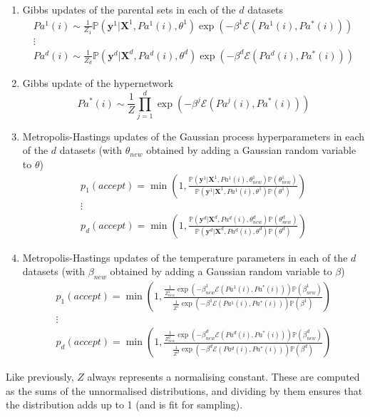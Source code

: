 \documentclass{article}
\begin{document}
\begin{enumerate}
\item Gibbs updates of the parental sets in each of the $d$ datasets
\begin{equation*}
\begin{split}
Pa^1(i) \sim \frac{1}{Z_{1}}\mathbb{P}(\mathbf{y}^1|\mathbf{X}^1,Pa^1(i),\theta^1)\exp\left ( -\beta^1\mathcal{E}(Pa^1(i),Pa^*(i)) \right ) \\
\vdots \\
Pa^d(i) \sim \frac{1}{Z_{d}}\mathbb{P}(\mathbf{y}^d|\mathbf{X}^d,Pa^d(i),\theta^d)\exp\left ( -\beta^d\mathcal{E}(Pa^d(i),Pa^*(i)) \right )
\end{split}
\end{equation*}
\item Gibbs update of the hypernetwork
\begin{equation*}
Pa^*(i) \sim \frac{1}{Z}\prod_{j=1}^{d}\exp\left ( -\beta^j\mathcal{E}(Pa^j(i),Pa^*(i)) \right )
\end{equation*}
\item Metropolis-Hastings updates of the Gaussian process hyperparameters in each of the $d$ datasets (with $\theta_{new}$ obtained by adding a Gaussian random variable to $\theta$)
\begin{equation*}
\begin{split}
p_1(accept) = \min\left(1,\frac{\mathbb{P}(\mathbf{y}^1|\mathbf{X}^1,Pa^1(i),\theta_{new}^1)\mathbb{P}(\theta_{new}^1)}{\mathbb{P}(\mathbf{y}^1|\mathbf{X}^1,Pa^1(i),\theta^1)\mathbb{P}(\theta^1)}\right) \\
\vdots \\
p_d(accept) = \min\left(1,\frac{\mathbb{P}(\mathbf{y}^d|\mathbf{X}^d,Pa^d(i),\theta_{new}^d)\mathbb{P}(\theta_{new}^d)}{\mathbb{P}(\mathbf{y}^d|\mathbf{X}^d,Pa^d(i),\theta^d)\mathbb{P}(\theta^d)}\right)
\end{split}
\end{equation*}
\item Metropolis-Hastings updates of the temperature parameters in each of the $d$ datasets (with $\beta_{new}$ obtained by adding a Gaussian random variable to $\beta$)
\begin{equation*}
\begin{split}
p_1(accept) = \min\left(1,\frac{\frac{1}{Z_{new}^1}\exp\left ( -\beta_{new}^1\mathcal{E}(Pa^1(i),Pa^*(i)) \right )\mathbb{P}(\beta_{new}^1)}{\frac{1}{Z^1}\exp\left ( -\beta^1\mathcal{E}(Pa^1(i),Pa^*(i)) \right )\mathbb{P}(\beta^1)}\right) \\
\vdots \\
p_d(accept) = \min\left(1,\frac{\frac{1}{Z_{new}^d}\exp\left ( -\beta_{new}^d\mathcal{E}(Pa^d(i),Pa^*(i)) \right )\mathbb{P}(\beta_{new}^d)}{\frac{1}{Z^d}\exp\left ( -\beta^d\mathcal{E}(Pa^d(i),Pa^*(i)) \right )\mathbb{P}(\beta^d)}\right)
\end{split}
\end{equation*}
\end{enumerate}
Like previously, $Z$ always represents a normalising constant. These are computed as the sums of the unnormalised distributions, and dividing by them ensures that the distribution adds up to 1 (and is fit for sampling).
\end{document}
